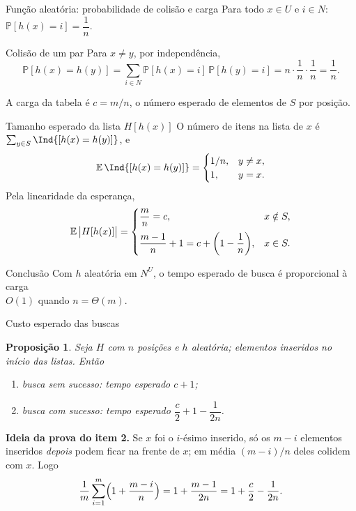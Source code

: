 \documentclass[aspectratio=169,11pt]{beamer}
\newtheorem{proposition}{Proposição}
\newcommand{\PP}{\mathbb P}
\begin{document}
\begin{frame}{Função aleatória: probabilidade de colisão e carga}
  Para todo $x\in U$ e $i\in N$: \quad $\PP[h(x)=i]=\dfrac1n$.
  \pause
  \begin{block}{Colisão de um par}
    Para $x\neq y$, por independência,
    \[
      \PP[h(x)=h(y)]=\sum_{i\in N}\PP[h(x)=i]\,\PP[h(y)=i]
      = n\cdot\frac1n\cdot\frac1n=\frac1n .
    \]
  \end{block}
  \pause
  \begin{definition}
    A \alert{carga} da tabela é $c=m/n$, o número esperado de elementos
    de $S$ por posição.
  \end{definition}
  \vspace{-0.3em}
\end{frame}

\begin{frame}{Tamanho esperado da lista $H[h(x)]$}
  O número de itens na lista de $x$ é $\sum_{y\in S}\Ind{[h(x)=h(y)]}$, e
  \[
    \E\,\Ind{[h(x)=h(y)]}=
    \begin{cases}
      1/n, & y\neq x,\\
      1, & y=x.
    \end{cases}
  \]
  \pause
  Pela \alert{linearidade da esperança},
  \[
    \E\,\bigl|H[h(x)]\bigr|=
    \begin{cases}
      \dfrac mn=c, & x\notin S,\\[2ex]
      \dfrac{m-1}{n}+1 = c + \paren*{ 1- \dfrac{1}n}, & x\in S.
    \end{cases}
  \]
  \pause
  \begin{alertblock}{Conclusão}
    Com $h$ aleatória em $N^U$, o tempo esperado de busca é
    proporcional à carga\\ \alert{$O(1)$ quando $n=\Theta(m)$}.
  \end{alertblock}
\end{frame}

\begin{frame}{Custo esperado das buscas}
  \begin{proposition}
    Seja $H$ com $n$ posições e $h$ aleatória; elementos inseridos no início
    das listas. Então
    \begin{enumerate}
    \item busca \emph{sem sucesso}: tempo esperado $c+1$;
    \item busca \emph{com sucesso}: tempo esperado
      $\dfrac c2+1-\dfrac1{2n}$.
    \end{enumerate}
  \end{proposition}
  \pause \textbf{Ideia da prova do item 2.} Se $x$ foi o $i$-ésimo
  inserido, só os $m-i$ elementos inseridos \emph{depois} podem ficar
  na frente de $x$; em média $(m-i)/n$ deles colidem com $x$. Logo
  \[
    \frac1m\sum_{i=1}^m\Bigl(1+\frac{m-i}n\Bigr)=1+\frac{m-1}{2n}
    =1+\frac c2-\frac1{2n}.
  \]
\end{frame}
\end{document}
